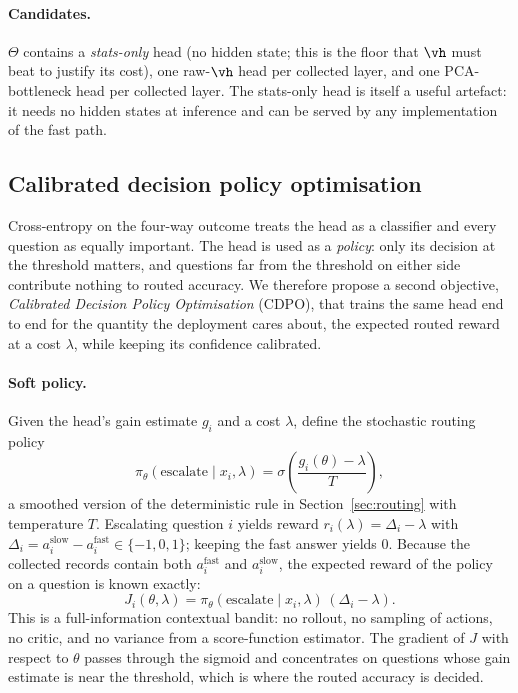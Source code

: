 \documentclass{article}
\newcommand{\fast}{\mathrm{fast}}
\newcommand{\slow}{\mathrm{slow}}
\newcommand{\gain}{g}
\newcommand{\cdpo}{CDPO}
\begin{document}
\paragraph{Candidates.}
$\Theta$ contains a \emph{stats-only} head (no hidden state; this is the floor that $\vh$ must beat to justify its cost), one raw-$\vh$ head per collected layer, and one PCA-bottleneck head per collected layer. The stats-only head is itself a useful artefact: it needs no hidden states at inference and can be served by any implementation of the fast path.

\subsection{Calibrated decision policy optimisation}
\label{sec:cdpo}

Cross-entropy on the four-way outcome treats the head as a classifier and every question as equally important. The head is used as a \emph{policy}: only its decision at the threshold matters, and questions far from the threshold on either side contribute nothing to routed accuracy. We therefore propose a second objective, \emph{Calibrated Decision Policy Optimisation} (\cdpo), that trains the same head end to end for the quantity the deployment cares about, the expected routed reward at a cost $\lambda$, while keeping its confidence calibrated.

\paragraph{Soft policy.} Given the head's gain estimate $\gain_i$ and a cost $\lambda$, define the stochastic routing policy
\begin{equation}
  \pi_\theta(\text{escalate}\mid x_i,\lambda)=\sigma\!\left(\frac{\gain_i(\theta)-\lambda}{T}\right),
  \label{eq:policy}
\end{equation}
a smoothed version of the deterministic rule in Section~\ref{sec:routing} with temperature $T$. Escalating question $i$ yields reward $r_i(\lambda)=\Delta_i-\lambda$ with $\Delta_i=a_i^{\slow}-a_i^{\fast}\in\{-1,0,1\}$; keeping the fast answer yields $0$. Because the collected records contain both $a_i^{\fast}$ and $a_i^{\slow}$, the expected reward of the policy on a question is known exactly:
\begin{equation}
  J_i(\theta,\lambda)=\pi_\theta(\text{escalate}\mid x_i,\lambda)\,(\Delta_i-\lambda).
\end{equation}
This is a full-information contextual bandit: no rollout, no sampling of actions, no critic, and no variance from a score-function estimator. The gradient of $J$ with respect to $\theta$ passes through the sigmoid and concentrates on questions whose gain estimate is near the threshold, which is where the routed accuracy is decided.
\end{document}
